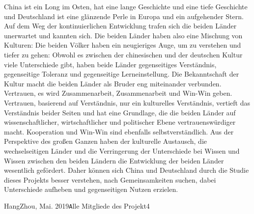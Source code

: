 \par
China ist ein Long im Osten, hat eine lange Geschichte und eine tiefe Geschichte und Deutschland ist eine glänzende Perle in Europa und ein aufgehender Stern. Auf dem Weg der kontinuierlichen Entwicklung trafen sich die beiden Länder unerwartet und kannten sich. Die beiden Länder haben also eine Mischung von Kulturen: Die beiden Völker haben ein neugieriges Auge, um zu verstehen und tiefer zu gehen: Obwohl es zwischen der chinesischen und der deutschen Kultur viele Unterschiede gibt, haben beide Länder gegenseitiges Verständnis, gegenseitige Toleranz und gegenseitige Lerneinstellung. Die Bekanntschaft der Kultur macht die beiden Länder als Bruder eng miteinander verbunden. Vertrauen, es wird Zusammenarbeit, Zusammenarbeit und Win-Win geben. Vertrauen, basierend auf Verständnis, nur ein kulturelles Verständnis, vertieft das Verständnis beider Seiten und hat eine Grundlage, die die beiden Länder auf wissenschaftlicher, wirtschaftlicher und politischer Ebene vertrauenswürdiger macht. Kooperation und Win-Win sind ebenfalls selbstverständlich. Aus der Perspektive des großen Ganzen haben der kulturelle Austausch, die wechselseitigen Länder und die Verringerung der Unterschiede bei Wissen und Wissen zwischen den beiden Ländern die Entwicklung der beiden Länder wesentlich gefördert. Daher können sich China und Deutschland durch die Studie dieses Projekts besser verstehen, nach Gemeinsamkeiten suchen, dabei Unterschiede aufheben und gegenseitigen Nutzen erzielen.
\vspace{\baselineskip}
\begin{flushright}\noindent
HangZhou, Mai.  2019\hfill {\texttt Alle Mitgliede des Projekt4}\\
\end{flushright}
